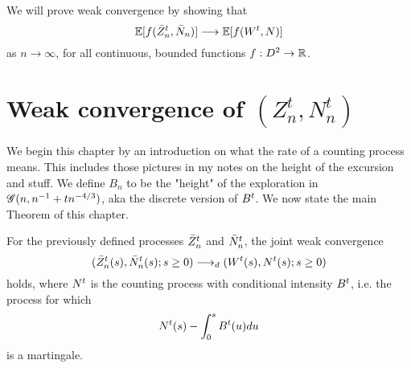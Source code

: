 We will prove weak convergence by showing that
\begin{equation}
\mathbb{E}[ f(\bar{Z}^t_n, \bar{N}_n) ] \longrightarrow \mathbb{E}[ f(W^t, N) ]
\end{equation}
as $n \rightarrow \infty$, 
for all continuous, bounded functions 
$f: D^2 \rightarrow \mathbb{R}$.


\section{Weak convergence of $(Z^t_n, N^t_n)$}

We begin this chapter by an introduction on what the rate of a counting process means.
This includes those pictures in my notes on the height of the excursion and stuff.
We define $B_n$ to be the "height" of the exploration in $\mathscr{G}(n, n^{-1} + tn^{-4/3})$, aka the discrete version of $B^t$.
We now state the main Theorem of this chapter.
\begin{theorem} \label{T: Joint Convergence}
	For the previously defined processes $\bar{Z}^t_n$ and $\bar{N}_n^t$,
	the joint weak convergence
	\begin{equation}
	( \bar{Z}^t_n(s), \bar{N}_n^t(s); s \geq 0 ) \longrightarrow_d (W^t(s), N^t(s); s \geq 0)
	\end{equation}
	holds, where $N^t$ is the counting process with conditional intensity $B^t$,
	i.e. the process for which
	\begin{equation*}
	N^t(s) - \int_{0}^s B^t(u)du
	\end{equation*}
	is a martingale.
\end{theorem}
